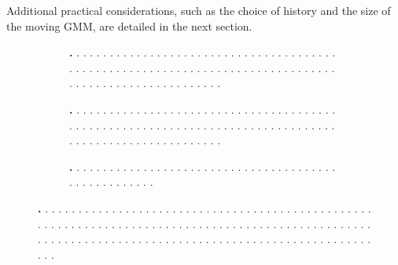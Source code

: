 \documentclass[letterpaper,10pt,conference,twoside]{IEEEtran}
\theoremstyle{definition}
\begin{document}
Additional practical considerations, such as the choice of history and the size of the moving GMM, are detailed in the next section.



\begin{figure}[t!]
  \centering
  \begin{subfigure}[t]{\linewidth}
  \hspace*{-.15cm}
  \caption{\textbf{.   }.   .   .   .   .   .   .   .   .   .   .   .   .   .   .   .   .   .   .   .   .   .   .   .   .   .   .   .   .   .   .   .   .   .   .   .   .   .   .   .   .   .   .   .   .   .   .   .   .   .   .   .   .   .   .   .   .   .   .   .   .   .   .   .   .   .   .   .   .   .   .   .   .   .   .   .   .   .   .   .   .   .   .   .   .   .   .   .   .   .   .   .   .   .   .   .   .   .   .   .   .   .}
  \label{fig:1-1}
  \end{subfigure}
  \vspace*{.1cm}
  \begin{subfigure}[t]{\linewidth}
  \hspace*{-.15cm}
  \caption{\textbf{.   }.   .   .   .   .   .   .   .   .   .   .   .   .   .   .   .   .   .   .   .   .   .   .   .   .   .   .   .   .   .   .   .   .   .   .   .   .   .   .   .   .   .   .   .   .   .   .   .   .   .   .   .   .   .   .   .   .   .   .   .   .   .   .   .   .   .   .   .   .   .   .   .   .   .   .   .   .   .   .   .   .   .   .   .   .   .   .   .   .   .   .   .   .   .   .   .   .   .   .   .   .   .}
  \label{fig:1-2}
  \end{subfigure}
  \vspace*{.1cm}
  \begin{subfigure}[t]{\linewidth}
  \hspace*{-.15cm}
  \caption{\textbf{.   }.   .   .   .   .   .   .   .   .   .   .   .   .   .   .   .   .   .   .   .   .   .   .   .   .   .   .   .   .   .   .   .   .   .   .   .   .   .   .   .   .   .   .   .   .   .   .   .   .   .   .   .}
  \label{fig:1-3}
  \end{subfigure}
  \caption[.]{\textbf{.   }.   .   .   .   .   .   .   .   .   .   .   .   .   .   .   .   .   .   .   .   .   .   .   .   .   .   .   .   .   .   .   .   .   .   .   .   .   .   .   .   .   .   .   .   .   .   .   .   .   .   .   .   .   .   .   .   .   .   .   .   .   .   .   .   .   .   .   .   .   .   .   .   .   .   .   .   .   .   .   .   .   .   .   .   .   .   .   .   .   .   .   .   .   .   .   .   .   .   .   .   .   .   .   .   .   .   .   .   .   .   .   .   .   .   .   .   .   .   .   .   .   .   .   .   .   .   .   .   .   .   .   .   .   .   .   .   .   .   .   .   .   .   .   .   .   .   .   .   .   .   .   .}
  \label{fig:1}
\end{figure}
\end{document}
